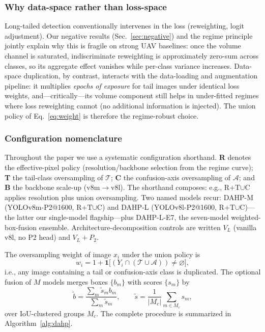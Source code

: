 \documentclass[journal]{IEEEtran}
\newcommand{\dahpL}{DAHP-L}
\newcommand{\dahpM}{DAHP-M}
\begin{document}
\subsubsection{Why data-space rather than loss-space}
Long-tailed detection conventionally intervenes in the loss (reweighting, logit adjustment). Our negative results (Sec.~\ref{sec:negative}) and the regime principle jointly explain why this is fragile on strong UAV baselines: once the volume channel is saturated, indiscriminate reweighting is approximately zero-sum across classes, so its aggregate effect vanishes while per-class variance increases. Data-space duplication, by contrast, interacts with the data-loading and augmentation pipeline: it multiplies \emph{epochs of exposure} for tail images under identical loss weights, and---critically---its volume component still helps in under-fitted regimes where loss reweighting cannot (no additional information is injected). The union policy of Eq.~\eqref{eq:weight} is therefore the regime-robust choice.

 \subsubsection{Configuration nomenclature}
Throughout the paper we use a systematic configuration shorthand. \textbf{R} denotes the effective-pixel policy (resolution/backbone selection from the regime curve); \textbf{T} the tail-class oversampling of $\mathcal{T}$; \textbf{C} the confusion-axis oversampling of $\mathcal{A}$; and \textbf{B} the backbone scale-up (v8m$\to$v8l). The shorthand composes: e.g., R$+$T$\cup$C applies resolution plus union oversampling. Two named models recur: \dahpM{} (YOLOv8m-P2@1600, R$+$T$\cup$C) and \dahpL{} (YOLOv8l-P2@1600, R$+$T$\cup$C)---the latter our single-model flagship---plus \dahpL{}-E7, the seven-model weighted-box-fusion ensemble. Architecture-decomposition controls are written $V_L$ (vanilla v8l, no P2 head) and $V_L{+}P_2$.

The oversampling weight of image $x_i$ under the union policy is
\begin{equation}
w_i = 1 + \mathbf{1}\big[(Y_i\cap(\mathcal{T}\cup\mathcal{A}))\neq\varnothing\big],
\label{eq:weight}
\end{equation}
i.e., any image containing a tail or confusion-axis class is duplicated. The optional fusion of $M$ models merges boxes $\{b_m\}$ with scores $\{s_m\}$ by
\begin{equation}
\tilde{b}=\frac{\sum_m \tilde{s}_m b_m}{\sum_m \tilde{s}_m},\qquad
\tilde{s}=\frac{1}{|M_c|}\sum_{m\in M_c}s_m,
\label{eq:wbf}
\end{equation}
over IoU-clustered groups $M_c$. The complete procedure is summarized in Algorithm~\ref{alg:dahp}.
\end{document}
